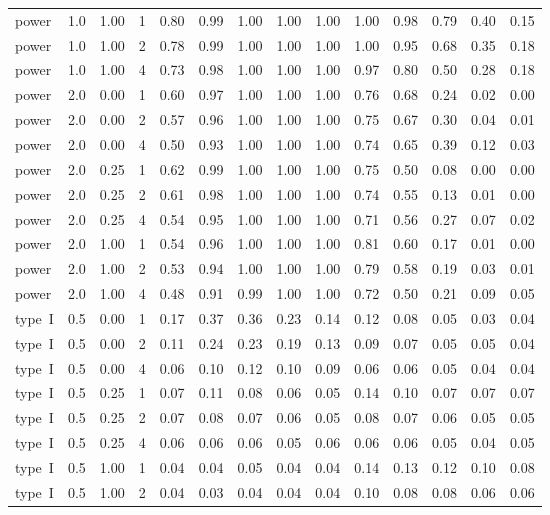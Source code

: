 \begin{table}
\begin{tabular}[t]{lrrrrrrrrrrrrr}
power & 1.0 & 1.00 & 1 & 0.80 & 0.99 & 1.00 & 1.00 & 1.00 & 1.00 & 0.98 & 0.79 & 0.40 & 0.15\\
power & 1.0 & 1.00 & 2 & 0.78 & 0.99 & 1.00 & 1.00 & 1.00 & 1.00 & 0.95 & 0.68 & 0.35 & 0.18\\
power & 1.0 & 1.00 & 4 & 0.73 & 0.98 & 1.00 & 1.00 & 1.00 & 0.97 & 0.80 & 0.50 & 0.28 & 0.18\\
power & 2.0 & 0.00 & 1 & 0.60 & 0.97 & 1.00 & 1.00 & 1.00 & 0.76 & 0.68 & 0.24 & 0.02 & 0.00\\
power & 2.0 & 0.00 & 2 & 0.57 & 0.96 & 1.00 & 1.00 & 1.00 & 0.75 & 0.67 & 0.30 & 0.04 & 0.01\\
power & 2.0 & 0.00 & 4 & 0.50 & 0.93 & 1.00 & 1.00 & 1.00 & 0.74 & 0.65 & 0.39 & 0.12 & 0.03\\
power & 2.0 & 0.25 & 1 & 0.62 & 0.99 & 1.00 & 1.00 & 1.00 & 0.75 & 0.50 & 0.08 & 0.00 & 0.00\\
power & 2.0 & 0.25 & 2 & 0.61 & 0.98 & 1.00 & 1.00 & 1.00 & 0.74 & 0.55 & 0.13 & 0.01 & 0.00\\
power & 2.0 & 0.25 & 4 & 0.54 & 0.95 & 1.00 & 1.00 & 1.00 & 0.71 & 0.56 & 0.27 & 0.07 & 0.02\\
power & 2.0 & 1.00 & 1 & 0.54 & 0.96 & 1.00 & 1.00 & 1.00 & 0.81 & 0.60 & 0.17 & 0.01 & 0.00\\
power & 2.0 & 1.00 & 2 & 0.53 & 0.94 & 1.00 & 1.00 & 1.00 & 0.79 & 0.58 & 0.19 & 0.03 & 0.01\\
power & 2.0 & 1.00 & 4 & 0.48 & 0.91 & 0.99 & 1.00 & 1.00 & 0.72 & 0.50 & 0.21 & 0.09 & 0.05\\
type~I & 0.5 & 0.00 & 1 & 0.17 & 0.37 & 0.36 & 0.23 & 0.14 & 0.12 & 0.08 & 0.05 & 0.03 & 0.04\\
type~I & 0.5 & 0.00 & 2 & 0.11 & 0.24 & 0.23 & 0.19 & 0.13 & 0.09 & 0.07 & 0.05 & 0.05 & 0.04\\
type~I & 0.5 & 0.00 & 4 & 0.06 & 0.10 & 0.12 & 0.10 & 0.09 & 0.06 & 0.06 & 0.05 & 0.04 & 0.04\\
type~I & 0.5 & 0.25 & 1 & 0.07 & 0.11 & 0.08 & 0.06 & 0.05 & 0.14 & 0.10 & 0.07 & 0.07 & 0.07\\
type~I & 0.5 & 0.25 & 2 & 0.07 & 0.08 & 0.07 & 0.06 & 0.05 & 0.08 & 0.07 & 0.06 & 0.05 & 0.05\\
type~I & 0.5 & 0.25 & 4 & 0.06 & 0.06 & 0.06 & 0.05 & 0.06 & 0.06 & 0.06 & 0.05 & 0.04 & 0.05\\
type~I & 0.5 & 1.00 & 1 & 0.04 & 0.04 & 0.05 & 0.04 & 0.04 & 0.14 & 0.13 & 0.12 & 0.10 & 0.08\\
type~I & 0.5 & 1.00 & 2 & 0.04 & 0.03 & 0.04 & 0.04 & 0.04 & 0.10 & 0.08 & 0.08 & 0.06 & 0.06\\

\end{tabular}
\end{table}
